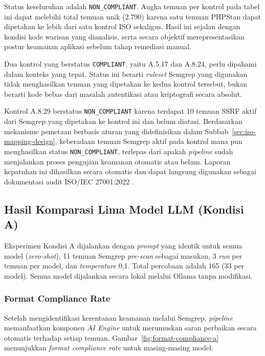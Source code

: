 Status keseluruhan adalah \texttt{NON\_COMPLIANT}. Angka temuan per kontrol pada tabel ini dapat melebihi total temuan unik (2.790) karena satu temuan PHPStan dapat dipetakan ke lebih dari satu kontrol ISO sekaligus. Hasil ini sejalan dengan kondisi kode warisan yang dianalisis, serta secara objektif merepresentasikan postur keamanan aplikasi sebelum tahap remediasi manual.

Dua kontrol yang berstatus \texttt{COMPLIANT}, yaitu A.5.17 dan A.8.24, perlu dipahami dalam konteks yang tepat. Status ini berarti \textit{ruleset} Semgrep yang digunakan tidak menghasilkan temuan yang dipetakan ke kedua kontrol tersebut, bukan berarti kode bebas dari masalah autentikasi atau kriptografi secara absolut.

Kontrol A.8.29 berstatus \texttt{NON\_COMPLIANT} karena terdapat 
10 temuan SSRF aktif dari Semgrep yang dipetakan ke kontrol ini 
dan belum diatasi. Berdasarkan mekanisme pemetaan berbasis aturan 
yang didefinisikan dalam Subbab~\ref{sec:iso-mapping-design}, 
keberadaan temuan Semgrep aktif pada kontrol mana pun menghasilkan 
status \texttt{NON\_COMPLIANT}, terlepas dari apakah \textit{pipeline} 
sudah menjalankan proses pengujian keamanan otomatis atau belum. 
Laporan kepatuhan ini dihasilkan secara otomatis dan dapat 
langsung digunakan sebagai dokumentasi audit ISO/IEC 27001:2022 \cite{iso27001_2022}.

\subsection{Hasil Komparasi Lima Model LLM (Kondisi A)}

Eksperimen Kondisi A dijalankan dengan \textit{prompt} yang identik untuk semua model (\textit{zero-shot}), 11 temuan Semgrep \textit{pre-scan} sebagai masukan, 3 \textit{run} per temuan per model, dan \textit{temperature} 0,1. Total percobaan adalah 165 (33 per model). Semua model dijalankan secara lokal melalui Ollama tanpa modifikasi.

\subsubsection{Format Compliance Rate}
Setelah mengidentifikasi kerentanan keamanan melalui Semgrep,
\textit{pipeline} memanfaatkan komponen \textit{AI Engine} untuk
merumuskan saran perbaikan secara otomatis terhadap setiap temuan.
Gambar~\ref{fig:format-compliance-a} menunjukkan
\textit{format compliance rate} untuk masing-masing model.

